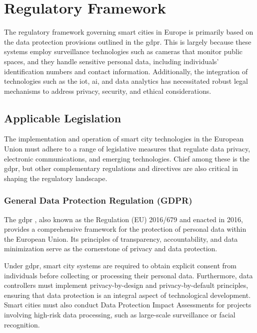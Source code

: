 \chapter{Regulatory Framework}\label{ch:regulatory_framework}

The regulatory framework governing smart cities in Europe is primarily based on the data protection provisions outlined in the \gls{gdpr}. This is largely because these systems employ surveillance technologies such as cameras that monitor public spaces, and they handle sensitive personal data, including individuals' identification numbers and contact information. Additionally, the integration of technologies such as the \gls{iot}, \gls{ai}, and data analytics has necessitated robust legal mechanisms to address privacy, security, and ethical considerations.

\section{Applicable Legislation}

The implementation and operation of smart city technologies in the European Union must adhere to a range of legislative measures that regulate data privacy, electronic communications, and emerging technologies. Chief among these is the \gls{gdpr}, but other complementary regulations and directives are also critical in shaping the regulatory landscape.

\subsection{General Data Protection Regulation (GDPR)}

The \gls{gdpr} \autocite{gdpr}, also known as the Regulation (EU) 2016/679 and enacted in 2016, provides a comprehensive framework for the protection of personal data within the European Union. Its principles of transparency, accountability, and data minimization serve as the cornerstone of privacy and data protection.

Under \gls{gdpr}, smart city systems are required to obtain explicit consent from individuals before collecting or processing their personal data. Furthermore, data controllers must implement privacy-by-design and privacy-by-default principles, ensuring that data protection is an integral aspect of technological development. Smart cities must also conduct Data Protection Impact Assessments for projects involving high-risk data processing, such as large-scale surveillance or facial recognition.


